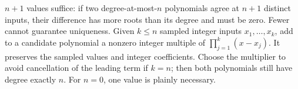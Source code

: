 $\boxed{n+1}$ values suffice: if two degree-at-most-$ n $ polynomials agree at $ n+1 $ distinct inputs, their difference has more roots than its degree and must be zero. Fewer cannot guarantee uniqueness. Given $ k\le n $ sampled integer inputs $ x_1,\ldots,x_k $, add to a candidate polynomial a nonzero integer multiple of $\prod_{j=1}^k(x-x_j)$. It preserves the sampled values and integer coefficients. Choose the multiplier to avoid cancellation of the leading term if $ k=n $; then both polynomials still have degree exactly $ n $. For $ n=0 $, one value is plainly necessary.
